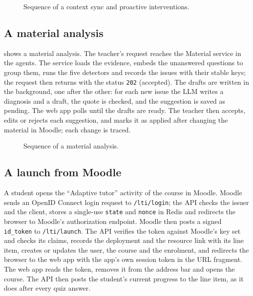 \begin{figure}[htbp]
  \centering
  \caption{Sequence of a context sync and proactive interventions.}
  \label{fig-seq-context}
\end{figure}

\subsection{A material analysis}

 shows a material analysis. The teacher's request
reaches the Material service in the agents. The service loads the
evidence, embeds the unanswered questions to group them, runs the five
detectors and records the issues with their stable keys; the request then
returns with the status \texttt{202} (accepted). The drafts are written
in the background, one after the other: for each new issue the LLM writes
a diagnosis and a draft, the quote is checked, and the suggestion is saved
as pending. The web app polls until the drafts are ready. The teacher then
accepts, edits or rejects each suggestion, and marks it as applied after
changing the material in Moodle; each change is traced.

\begin{figure}[htbp]
  \centering
  \caption{Sequence of a material analysis.}
  \label{fig-seq-material}
\end{figure}

\subsection{A launch from Moodle}

A student opens the ``Adaptive tutor'' activity of the course in Moodle.
Moodle sends an OpenID Connect login request to \texttt{/lti/login}; the
API checks the issuer and the client, stores a single-use \texttt{state}
and \texttt{nonce} in Redis and redirects the browser to Moodle's
authorization endpoint. Moodle then posts a signed \texttt{id\_token} to
\texttt{/lti/launch}. The API verifies the token against Moodle's key set
and checks its claims, records the deployment and the resource link with
its line item, creates or updates the user, the course and the
enrolment, and redirects the browser to the web app with the app's own
session token in the URL fragment. The web app reads the token, removes
it from the address bar and opens the course. The API then posts the
student's current progress to the line item, as it does after every quiz
answer.

